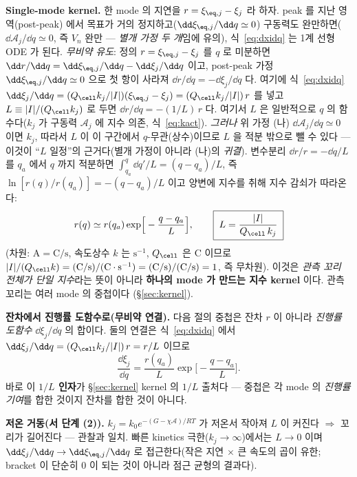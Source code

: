 \textbf{Single-mode kernel.} 한 mode 의 지연을 $r=\xi_{\eq,j}-\xi_j$ 라 하자. peak 를 지난 영역(post-peak)
에서 목표가 거의 정지하고($\dd\xi_{\eq,j}/\dd q\simeq0$) 구동력도 완만하면($\dd\mathcal A_j/\dd q\simeq0$,
즉 $V_n$ 완만 — \emph{별개 가정 두 개}임에 유의), 식~\eqref{eq:dxidq} 는 1계 선형 ODE 가 된다.
\emph{무비약 유도}: 정의 $r=\xi_{\eq,j}-\xi_j$ 를 $q$ 로 미분하면 $\dd r/\dd q=\dd\xi_{\eq,j}/\dd q-\dd\xi_j/\dd q$
이고, post-peak 가정 $\dd\xi_{\eq,j}/\dd q\simeq0$ 으로 첫 항이 사라져 $\dd r/\dd q=-\dd\xi_j/\dd q$ 다. 여기에
식~\eqref{eq:dxidq} $\dd\xi_j/\dd q=(Q_\cell k_j/|I|)(\xi_{\eq,j}-\xi_j)=(Q_\cell k_j/|I|)\,r$ 를 넣고
$L\equiv|I|/(Q_\cell k_j)$ 로 두면 $\dd r/\dd q=-(1/L)\,r$ 다. 여기서 $L$ 은 일반적으로 $q$ 의 함수다($k_j$ 가
구동력 $\mathcal A_j$ 에 지수 의존, 식~\eqref{eq:kact}). \emph{그러나} 위 가정 (나) $\dd\mathcal A_j/\dd q\simeq0$
이면 $k_j$, 따라서 $L$ 이 이 구간에서 $q$-무관(상수)이므로 $L$ 을 적분 밖으로 뺄 수 있다 — 이것이 ``$L$ 일정''의
근거다(별개 가정이 아니라 (나)의 \emph{귀결}). 변수분리 $\dd r/r=-\dd q/L$ 를 $q_a$ 에서 $q$ 까지 적분하면
$\int_{q_a}^q \dd q'/L=(q-q_a)/L$, 즉 $\ln[r(q)/r(q_a)]=-(q-q_a)/L$ 이고 양변에 지수를 취해 지수 감쇠가 따라온다:
\begin{equation}
r(q)\simeq r(q_a)\exp\!\Big[-\frac{q-q_a}{L}\Big],\qquad \boxed{\;L=\frac{|I|}{Q_\cell\,k_j}\;}
\label{eq:single_kernel}
\end{equation}
(차원: $\mathrm A=\mathrm{C/s}$, 속도상수 $k$ 는 $\mathrm{s^{-1}}$, $Q_\cell$ 은 $\mathrm C$ 이므로
$|I|/(Q_\cell k)=(\mathrm{C/s})/(\mathrm C\cdot\mathrm{s^{-1}})=(\mathrm{C/s})/(\mathrm{C/s})=1$, 즉 무차원).
이것은 \emph{관측 꼬리 전체가 단일
지수}라는 뜻이 아니라 \textbf{하나의 mode 가 만드는 지수 kernel} 이다. 관측 꼬리는 여러 mode 의 중첩이다
(\S\ref{sec:kernel}).

\textbf{잔차에서 진행률 도함수로(무비약 연결).} 다음 절의 중첩은 잔차 $r$ 이 아니라 \emph{진행률 도함수}
$\dd\xi_j/\dd q$ 의 합이다. 둘의 연결은 식~\eqref{eq:dxidq} 에서 $\dd\xi_j/\dd q=(Q_\cell k_j/|I|)\,r=r/L$
이므로
\begin{equation}
\frac{\dd\xi_j}{\dd q}=\frac{r(q_a)}{L}\exp\!\Big[-\frac{q-q_a}{L}\Big].
\label{eq:single_dxidq}
\end{equation}
바로 이 \textbf{$1/L$ 인자}가 \S\ref{sec:kernel} kernel 의 $1/L$ 출처다 — 중첩은 각 mode 의 \emph{진행률
기여}를 합한 것이지 잔차를 합한 것이 아니다.

\textbf{저온 거동(서 단계 (2)).} $k_j=k_0e^{-(G-\chi\mathcal A)/RT}$ 가 저온서 작아져 $L$ 이 커진다 $\Rightarrow$
꼬리가 길어진다 — 관찰과 일치. 빠른 kinetics 극한($k_j\to\infty$)에서는 $L\to0$ 이며 $\dd\xi_j/\dd q\to
\dd\xi_{\eq,j}/\dd q$ 로 접근한다(작은 지연 $\times$ 큰 속도의 곱이 유한; bracket 이 단순히 0 이 되는 것이
아니라 점근 균형의 결과다).


